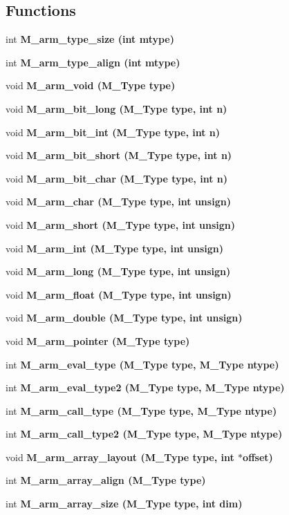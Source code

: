 \subsection*{Functions}
\begin{CompactItemize}
\item 
int \bf{M\_\-arm\_\-type\_\-size} (int mtype)
\item 
int \bf{M\_\-arm\_\-type\_\-align} (int mtype)
\item 
void \bf{M\_\-arm\_\-void} (\bf{M\_\-Type} type)
\item 
void \bf{M\_\-arm\_\-bit\_\-long} (\bf{M\_\-Type} type, int n)
\item 
void \bf{M\_\-arm\_\-bit\_\-int} (\bf{M\_\-Type} type, int n)
\item 
void \bf{M\_\-arm\_\-bit\_\-short} (\bf{M\_\-Type} type, int n)
\item 
void \bf{M\_\-arm\_\-bit\_\-char} (\bf{M\_\-Type} type, int n)
\item 
void \bf{M\_\-arm\_\-char} (\bf{M\_\-Type} type, int unsign)
\item 
void \bf{M\_\-arm\_\-short} (\bf{M\_\-Type} type, int unsign)
\item 
void \bf{M\_\-arm\_\-int} (\bf{M\_\-Type} type, int unsign)
\item 
void \bf{M\_\-arm\_\-long} (\bf{M\_\-Type} type, int unsign)
\item 
void \bf{M\_\-arm\_\-float} (\bf{M\_\-Type} type, int unsign)
\item 
void \bf{M\_\-arm\_\-double} (\bf{M\_\-Type} type, int unsign)
\item 
void \bf{M\_\-arm\_\-pointer} (\bf{M\_\-Type} type)
\item 
int \bf{M\_\-arm\_\-eval\_\-type} (\bf{M\_\-Type} type, \bf{M\_\-Type} ntype)
\item 
int \bf{M\_\-arm\_\-eval\_\-type2} (\bf{M\_\-Type} type, \bf{M\_\-Type} ntype)
\item 
int \bf{M\_\-arm\_\-call\_\-type} (\bf{M\_\-Type} type, \bf{M\_\-Type} ntype)
\item 
int \bf{M\_\-arm\_\-call\_\-type2} (\bf{M\_\-Type} type, \bf{M\_\-Type} ntype)
\item 
void \bf{M\_\-arm\_\-array\_\-layout} (\bf{M\_\-Type} type, int $\ast$offset)
\item 
int \bf{M\_\-arm\_\-array\_\-align} (\bf{M\_\-Type} type)
\item 
int \bf{M\_\-arm\_\-array\_\-size} (\bf{M\_\-Type} type, int dim)
\item 

\end{CompactItemize}
